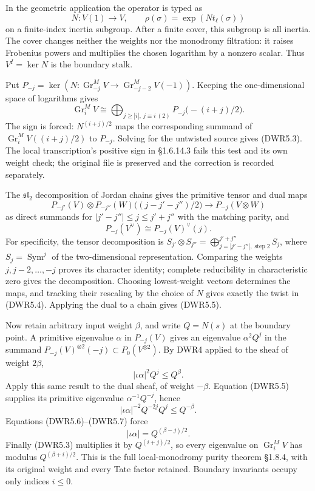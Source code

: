 In the geometric application the operator is typed as \[
N:V(1)\longrightarrow V,
\qquad \rho(\sigma)=\exp(Nt_\ell(\sigma))
\tag{DWR5.2}
\] on a finite-index inertia subgroup. After a finite cover, this
subgroup is all inertia. The cover changes neither the weights nor the
monodromy filtration: it raises Frobenius powers and multiplies the
chosen logarithm by a nonzero scalar. Thus \(V^I=\ker N\) is the
boundary stalk.

Put
\(P_{-j}=\ker(N:\operatorname{Gr}_{-j}^M V\to\operatorname{Gr}_{-j-2}^M V(-1))\).
Keeping the one-dimensional space of logarithms gives \[
\operatorname{Gr}_i^M V\cong
\bigoplus_{j\ge|i|,\ j\equiv i\ (2)}P_{-j}\bigl(-(i+j)/2\bigr).
\tag{DWR5.3}
\] The sign is forced: \(N^{(i+j)/2}\) maps the corresponding summand of
\(\operatorname{Gr}_i^M V((i+j)/2)\) to \(P_{-j}\). Solving for the
untwisted source gives (DWR5.3). The local transcription's positive sign
in §1.6.14.3 fails this test and its own weight check; the original file
is preserved and the correction is recorded separately.

The \(\mathfrak{sl}_2\) decomposition of Jordan chains gives the
primitive tensor and dual maps \[
P_{-j'}(V)\otimes P_{-j''}(W)
\bigl((j-j'-j'')/2\bigr)\longrightarrow P_{-j}(V\otimes W)
\tag{DWR5.4}
\] as direct summands for \(|j'-j''|\le j\le j'+j''\) with the matching
parity, and \[
P_{-j}(V^\vee)\cong P_{-j}(V)^\vee(j).
\tag{DWR5.5}
\] For specificity, the tensor decomposition is
\(S_{j'}\otimes S_{j''}=\bigoplus_{j=|j'-j''|,\;\mathrm{step}\;2}^{j'+j''}S_j\),
where \(S_j=\operatorname{Sym}^j\) of the two-dimensional
representation. Comparing the weights \(j,j-2,\ldots,-j\) proves its
character identity; complete reducibility in characteristic zero gives
the decomposition. Choosing lowest-weight vectors determines the maps,
and tracking their rescaling by the choice of \(N\) gives exactly the
twist in (DWR5.4). Applying the dual to a chain gives (DWR5.5).

Now retain arbitrary input weight \(\beta\), and write \(Q=N(s)\) at the
boundary point. A primitive eigenvalue \(\alpha\) in \(P_{-j}(V)\) gives
an eigenvalue \(\alpha^2Q^j\) in the summand
\(P_{-j}(V)^{\otimes2}(-j)\subset P_0(V^{\otimes2})\). By DWR4 applied
to the sheaf of weight \(2\beta\), \[
|\iota\alpha|^2Q^j\le Q^{\beta}.
\tag{DWR5.6}
\] Apply this same result to the dual sheaf, of weight \(-\beta\).
Equation (DWR5.5) supplies its primitive eigenvalue
\(\alpha^{-1}Q^{-j}\), hence \[
|\iota\alpha|^{-2}Q^{-2j}Q^j\le Q^{-\beta}.
\tag{DWR5.7}
\] Equations (DWR5.6)--(DWR5.7) force \[
|\iota\alpha|=Q^{(\beta-j)/2}.
\tag{DWR5.8}
\] Finally (DWR5.3) multiplies it by \(Q^{(i+j)/2}\), so every
eigenvalue on \(\operatorname{Gr}_i^M V\) has modulus
\(Q^{(\beta+i)/2}\). This is the full local-monodromy purity theorem
§1.8.4, with its original weight and every Tate factor retained.
Boundary invariants occupy only indices \(i\le0\).

